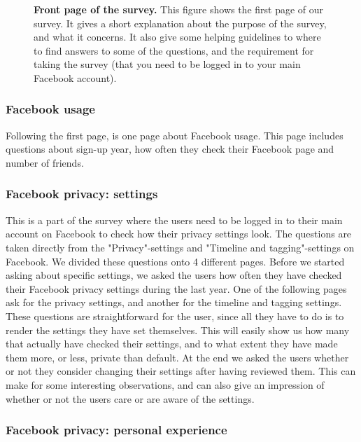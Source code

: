 \begin{figure}[h!]
\centering
{}
\caption[Front page of the survey]{\textbf{Front page of the survey.} This figure shows the first page of our survey. It gives a short explanation about the purpose of the survey, and what it concerns. It also give some helping guidelines to where to find answers to some of the questions, and the requirement for taking the survey (that you need to be logged in to your main Facebook account).} 
\label{fig:frontpage}
\end{figure}

\subsubsection{Facebook usage}
Following the first page, is one page about Facebook usage. This page includes questions about sign-up year, how often they check their Facebook page and number of friends. 

\subsubsection{Facebook privacy: settings}
This is a part of the survey where the users need to be logged in to their main account on Facebook to check how their privacy settings look. The questions are taken directly from the "Privacy"-settings and "Timeline and tagging"-settings on Facebook. We divided these questions onto 4 different pages. Before we started asking about specific settings, we asked the users how often they have checked their Facebook privacy settings during the last year.  One of the following pages ask for the privacy settings, and another for the timeline and tagging settings. These questions are straightforward for the user, since all they have to do is to render the settings they have set themselves. This will easily show us how many that actually have checked their settings, and to what extent they have made them more, or less, private than default. At the end we asked the users whether or not they consider changing their settings after having reviewed them. This can make for some interesting observations, and can also give an impression of whether or not the users care or are aware of the settings. 

\subsubsection{Facebook privacy: personal experience}

